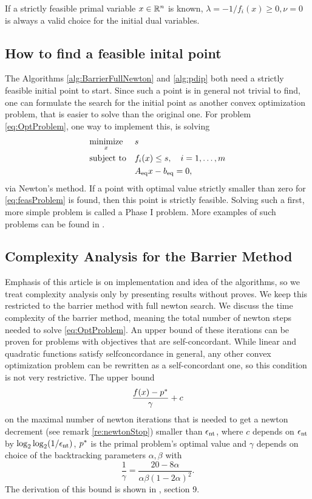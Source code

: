\begin{remark}
	If a strictly feasible primal variable $ x \in \mathbb{R}^n $ is known, $ \lambda= -1/f_i(x) \geq 0, \nu=0 $ is always a valid choice for the initial dual variables.
\end{remark}
 
 
\subsection{How to find a feasible inital point}
The Algorithms \ref{alg:BarrierFullNewton} and \ref{alg:pdip} both need a strictly feasible initial point to start. Since such a point is in general not trivial to find, one can formulate the search for the initial point as another convex optimization problem, that is easier to solve than the original one.  
For problem \eqref{eq:OptProblem}, one way to implement this, is solving
\begin{equation}
	\begin{aligned} & \underset{x}{\text{minimize}} & & s\\ & \text{subject to} & & f_i(x) \leq s, \quad i=1,\dots,m\\ & & &{A}_{\mathrm{eq}} x - {b}_{\mathrm{eq}} = 0, \; \end{aligned}
	\label{eq:feasProblem}
\end{equation}
via Newton's method. If a point with optimal value strictly smaller than zero for \eqref{eq:feasProblem} is found, then this point is strictly feasible. Solving such a first, more simple problem is called a Phase I problem. More examples of such problems can be found in \cite{BV}.


\subsection{Complexity Analysis for the Barrier Method}
Emphasis of this article is on implementation and idea of the algorithms, so we treat complexity analysis only by presenting results without proves. We keep this restricted to the barrier method with full newton search.  We discuss the time complexity of the barrier method, meaning the total number of newton steps needed to solve \eqref{eq:OptProblem}. 
An upper bound of these iterations can be proven for problems with objectives that are self-concordant. While linear and quadratic functions satisfy selfconcordance in general, any other convex optimization problem can be rewritten as a self-concordant one, so this condition is not very restrictive.
The upper bound
\begin{equation} %
	\frac{\fx - \popt}{\gamma} + c
\end{equation}
on the maximal number of newton iterations that is needed to get a newton decrement (see remark \ref{re:newtonStop}) smaller than $ {\epsilon}_{\mathrm{nt}} $, where $ c $ depends on $  {\epsilon}_{\mathrm{nt}} $ by $ \log_2 \log_2(1/{\epsilon}_{\mathrm{nt}}) $, $ p^* $ is the primal problem's  optimal value and $ \gamma $ depends on choice of the backtracking parameters $ \alpha, \beta $ with\[ \frac{1}{\gamma} = \frac{20-8\alpha}{\alpha \beta (1-2\alpha)^2}.\]
The derivation of this bound is shown in \cite{BV}, section 9.

